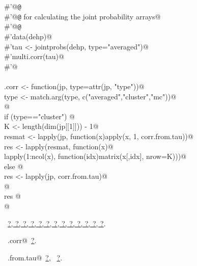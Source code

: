 \documentclass[reqno]{amsart}
\renewcommand{\NWlink}[2]{\hyperlink{#1}{#2}}
\begin{document}
\begin{flushleft}
\begin{list}{}{}
\mbox{}\verb@#'@{\tt @}\verb@export@\\
\mbox{}\verb@#'@{\tt @}\verb@seealso {} for calculating the joint probability arrays@\\
\mbox{}\verb@#'@{\tt @}\verb@examples@\\
\mbox{}\verb@#'data(dehp)@\\
\mbox{}\verb@#'tau <- jointprobs(dehp, type="averaged")@\\
\mbox{}\verb@#'multi.corr(tau)@\\
\mbox{}\verb@#'@\\
\mbox{}\verb@@\\
\mbox{}\verb@multi.corr <- function(jp, type=attr(jp, "type")){@\\
\mbox{}\verb@  type <- match.arg(type, c("averaged","cluster","mc"))@\\
\mbox{}\verb@  @\\
\mbox{}\verb@  if (type=="cluster") {@\\
\mbox{}\verb@    K <- length(dim(jp[[1]])) - 1@\\
\mbox{}\verb@    resmat <- lapply(jp, function(x)apply(x, 1, corr.from.tau))@\\
\mbox{}\verb@    res <- lapply(resmat, function(x){@\\
\mbox{}\verb@                  lapply(1:ncol(x), function(idx)matrix(x[,idx], nrow=K))})@\\
\mbox{}\verb@  } else {@\\
\mbox{}\verb@    res <- lapply(jp, corr.from.tau)@\\
\mbox{}\verb@  }@\\
\mbox{}\verb@  res  @\\
\mbox{}\verb@}@\\
\mbox{}\verb@@{\NWsep}
\end{list}
\vspace{-1.5ex}
\footnotesize
\begin{list}{}{\setlength{\itemsep}{-\parsep}\setlength{\itemindent}{-\leftmargin}}
\item \NWtxtFileDefBy\ \NWlink{nuweb?}{?}\NWlink{nuweb?}{, ?}\NWlink{nuweb?}{, ?}\NWlink{nuweb?}{, ?}\NWlink{nuweb?}{, ?}\NWlink{nuweb?}{, ?}\NWlink{nuweb?}{, ?}\NWlink{nuweb?}{, ?}\NWlink{nuweb?}{, ?}\NWlink{nuweb?}{, ?}\NWlink{nuweb?}{, ?}\NWlink{nuweb?}{, ?}\NWlink{nuweb?}{, ?}.
\item \NWtxtIdentsDefed\nobreak\  \verb@multi.corr@\nobreak\ \NWlink{nuweb?}{?}.\item \NWtxtIdentsUsed\nobreak\  \verb@corr.from.tau@\nobreak\ \NWlink{nuweb?}{?}, \verb@tau@\nobreak\ \NWlink{nuweb?}{?}.
\item{}
\end{list}
\vspace{4ex}
\end{flushleft}
\end{document}
